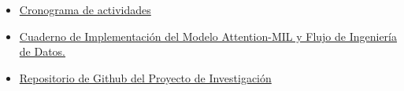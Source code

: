 \begin{itemize}
     \item \href{https://drive.google.com/file/d/1L7VoDJk_7w4tyqen5Lit_a5-qwMPtpGx/view?usp=sharing}{Cronograma de actividades}
     \item \href{https://drive.google.com/file/d/1MVecYuB9uj3JcFwHH7GrIHgBlptLfABM/view?usp=sharing}{Cuaderno de Implementación del Modelo Attention-MIL y Flujo de Ingeniería de Datos.}
     \item \href{https://github.com/JuanjoRestrepo/Trabajo-de-Grado-WSI-MIL}{Repositorio de Github del Proyecto de Investigación}
\end{itemize}